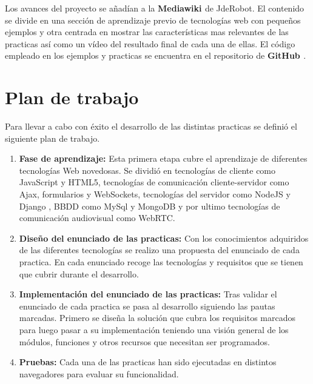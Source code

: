 Los avances del proyecto se añadían a la \textbf{Mediawiki \cite{Mediawiki}} de JdeRobot. El contenido se divide en una sección de aprendizaje previo de tecnologías web con pequeños ejemplos y otra centrada en mostrar las características mas relevantes de las practicas así como un vídeo del resultado final de cada una de ellas. El código empleado en los ejemplos y practicas se encuentra en el repositorio de \textbf{GitHub \cite{Repositorio}}.
\section{Plan de trabajo}
Para llevar a cabo con éxito el desarrollo de las distintas practicas se definió el siguiente plan de trabajo.
\begin{enumerate}
\item \textbf{Fase de aprendizaje:} Esta primera etapa cubre el aprendizaje de diferentes tecnologías Web novedosas. Se dividió en tecnologías de cliente como JavaScript y HTML5, tecnologías de comunicación cliente-servidor como Ajax, formularios y WebSockets, tecnologías del servidor como NodeJS y  Django , BBDD como  MySql y MongoDB y por ultimo tecnologías de comunicación audiovisual como WebRTC.
\item \textbf{Diseño del enunciado de las practicas:} Con los conocimientos adquiridos de las diferentes tecnologías se realizo una propuesta del enunciado de cada practica. En cada enunciado recoge las tecnologías y requisitos que se tienen que cubrir durante el desarrollo.
\item \textbf{Implementación del enunciado de las practicas:} Tras validar el enunciado de cada practica se pasa al desarrollo siguiendo las pautas marcadas. Primero se diseña la solución que cubra los requisitos marcados para luego pasar a su implementación teniendo una visión general de los módulos, funciones y otros recursos que necesitan ser programados.
\item \textbf{Pruebas:} Cada una de las practicas han sido ejecutadas en distintos navegadores para evaluar su funcionalidad.
\end{enumerate}
